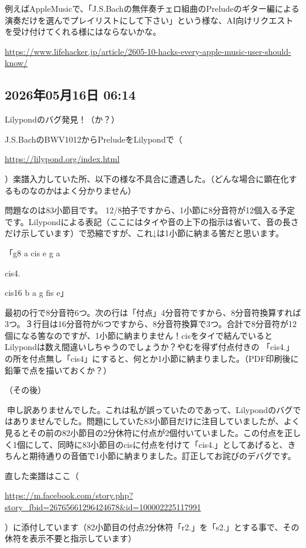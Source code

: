 \documentclass[facebook_diary.tex]{subfiles}
\begin{document}
例えばAppleMusicで、「J.S.Bachの無伴奏チェロ組曲のPreludeのギター編による演奏だけを選んでプレイリストにして下さい」という様な、AI向けリクエストを受け付けてくれる様にはならないかな。

\url{https://www.lifehacker.jp/article/2605-10-hacks-every-apple-music-user-should-know/}



\subsection*{2026年05月16日 06:14}

Lilypondのバグ発見！（か？）


J.S.BachのBWV1012からPreludeをLilypondで（ 

\url{https://lilypond.org/index.html}

 ）楽譜入力していた所、以下の様な不具合に遭遇した。（どんな場合に顕在化するものなのかはよく分かりません）

問題なのは83小節目です。 12/8拍子ですから、1小節に8分音符が12個入る予定です。Lilypondによる表記（ここにはタイや音の上下の指示は省いて、音の長さだけ示しています）で恐縮ですが、これ↓は1小節に納まる筈だと思います。

「g8 a cis e g a

cis4.

cis16 b a g fis e」

最初の行で8分音符6つ。次の行は「付点」4分音符ですから、8分音符換算すれば3つ。３行目は16分音符が6つですから、8分音符換算で3つ。合計で8分音符が12個になる筈なのですが、1小節に納まりません！cisをタイで結んでいるとLilypondは数え間違いしちゃうのでしょうか？やむを得ず付点付きの 「cis4.」の所を付点無し「cis4」にすると、何とか1小節に納まりました。（PDF印刷後に鉛筆で点を描いておくか？）


（その後）

🙇申し訳ありませんでした。これは私が誤っていたのであって、Lilypondのバグではありませんでした。問題にしていた83小節目だけに注目していましたが、よく見るとその前の82小節目の2分休符に付点が2個付いていました。この付点を正しく1個にして、同時に83小節目のcisに付点を付けて「cis4.」としてあげると、きちんと期待通りの音価で1小節に納まりました。訂正してお詫びのデバグです。

直した楽譜はここ（ 

\url{https://m.facebook.com/story.php?story_fbid=26765661296424678&id=100002225117991}

 ）に添付しています（82小節目の付点2分休符「r2.」を「s2.」とする事で、その休符を表示不要と指示しています）
\end{document}
